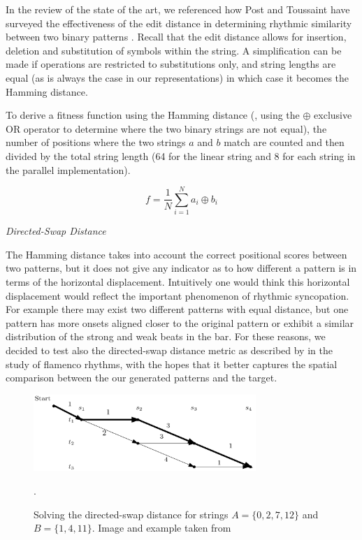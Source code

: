 In the review of the state of the art, we referenced how Post and Toussaint have surveyed the effectiveness of the edit distance in determining rhythmic similarity between two binary patterns \citep{Post2011}. Recall that the edit distance allows for insertion, deletion and substitution of symbols within the string. A simplification can be made if operations are restricted to substitutions only, and string lengths are equal (as is always the case in our representations) in which case it becomes the Hamming distance. 

To derive a fitness function using the Hamming distance (, using the $\oplus$ exclusive OR operator to determine where the two binary strings are not equal), the number of positions where the two strings $a$ and $b$ match are counted and then divided by the total string length (64 for the linear string and 8 for each string in the parallel implementation). 

\begin{equation}
\label{eq:fitness_hamming}
	f=\frac{1}{N}\sum_{i=1}^{N}a_i \oplus b_i
\end{equation}

\textit{Directed-Swap Distance}

\label{sec:directed_swap}

The Hamming distance takes into account the correct positional scores between two patterns, but it does not give any indicator as to how different a pattern is in terms of the horizontal displacement. Intuitively one would think this horizontal displacement would reflect the important phenomenon of rhythmic syncopation. For example there may exist two different patterns with equal distance, but one pattern has more onsets aligned closer to the original pattern or exhibit a similar distribution of the strong and weak beats in the bar. For these reasons, we decided to test also the directed-swap distance metric as described by \cite{Diaz-Banez2004} in the study of flamenco rhythms, with the hopes that it better captures the spatial comparison between the our generated patterns and the target.

\begin{figure}
	\begin{center}
		\includegraphics[width=0.75\textwidth]{ch03_symbolic/figures/shortest_path.png}
	\end{center}
	\caption[Solving the directed-swap distance graph for two strings]{Solving the directed-swap distance for strings $A=\{0,2,7,12\}$ and $B=\{1,4,11\}$. Image and example taken from \cite{Colannino2005}}.
	\label{fig:dijkstra}
\end{figure}

